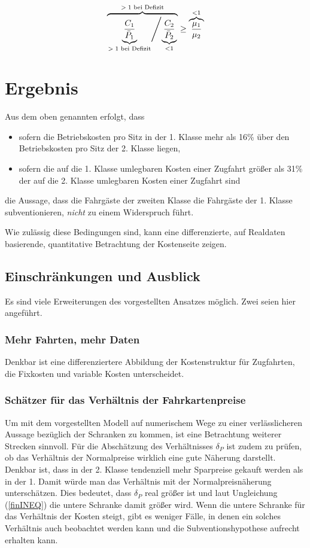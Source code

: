 \documentclass[a4paper,12pt]{article}
\begin{document}
\begin{equation}
\overbrace{\left. \underbrace{{\frac{C_1}{\bar P_1}}}_{\textrm{$>1$ bei Defizit}} \middle/ {\underbrace{\frac{C_2}{\bar P_2}}_{< 1}} \right. }^{\textrm{$>1$ bei Defizit}} \geq  \overbrace{\frac{\mu_1}{\mu_2}}^{<1}
\label{Grenzertrag}
\end{equation}

\section{Ergebnis}

Aus dem oben genannten erfolgt, dass 
\begin{itemize}
\item sofern die Betriebskosten pro Sitz in der 1. Klasse mehr als 16\% über den Betriebskosten pro Sitz der 2. Klasse liegen, 
\item sofern die auf die 1. Klasse umlegbaren Kosten einer Zugfahrt größer als 31\% der auf die 2. Klasse umlegbaren Kosten einer Zugfahrt sind
\end{itemize}

die Aussage, dass die Fahrgäste der zweiten Klasse die Fahrgäste der 1. Klasse subventionieren, \textit{nicht} zu einem Widerspruch führt. 

Wie zulässig diese Bedingungen sind, kann eine differenzierte, auf Realdaten basierende, quantitative Betrachtung der Kostenseite zeigen.

\subsection{Einschränkungen und Ausblick}
Es sind viele Erweiterungen des vorgestellten Ansatzes möglich. Zwei seien hier angeführt.

\subsubsection{Mehr Fahrten, mehr Daten}
Denkbar ist eine differenziertere Abbildung der Kostenstruktur für Zugfahrten, die Fixkosten und variable Kosten unterscheidet. 

\subsubsection{Schätzer für das Verhältnis der Fahrkartenpreise}
Um mit dem vorgestellten Modell auf numerischem Wege zu einer verlässlicheren Aussage bezüglich der Schranken zu kommen, ist eine Betrachtung weiterer Strecken sinnvoll. Für die Abschätzung des Verhältnisses $\delta_P$ ist zudem zu prüfen, ob das Verhältnis der Normalpreise wirklich eine gute Näherung darstellt. Denkbar ist, dass in der 2. Klasse tendenziell mehr Sparpreise gekauft werden als in der 1. Damit würde man das Verhältnis mit der Normalpreisnäherung unterschätzen. Dies bedeutet, dass $\delta_P$ real größer ist und laut Ungleichung (\ref{finINEQ}) die untere Schranke damit größer wird. Wenn die untere Schranke für das Verhältnis der Kosten steigt, gibt es weniger Fälle, in denen ein solches Verhältnis auch beobachtet werden kann und die Subventionshypothese aufrecht erhalten kann.
\end{document}
